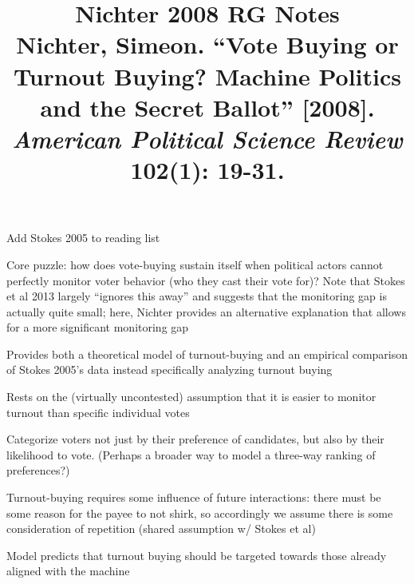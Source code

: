 \documentclass[12pt]{article}
\title{\textbf{Nichter 2008 RG Notes}\\
\large Nichter, Simeon. ``Vote Buying or Turnout Buying? Machine Politics and the Secret Ballot'' [2008].\\
\textit{American Political Science Review} 102(1): 19-31.}
\author{}
\date{}
\begin{document}
\maketitle

Add Stokes 2005 to reading list

Core puzzle: how does vote-buying sustain itself when political actors cannot perfectly monitor voter behavior (who they cast their vote for)? Note that Stokes et al 2013 largely ``ignores this away'' and suggests that the monitoring gap is actually quite small; here, Nichter provides an alternative explanation that allows for a more significant monitoring gap

Provides both a theoretical model of turnout-buying and an empirical comparison of Stokes 2005's data instead specifically analyzing turnout buying

Rests on the (virtually uncontested) assumption that it is easier to monitor turnout than specific individual votes

Categorize voters not just by their preference of candidates, but also by their likelihood to vote. (Perhaps a broader way to model a three-way ranking of preferences?)

Turnout-buying requires some influence of future interactions: there must be some reason for the payee to not shirk, so accordingly we assume there is some consideration of repetition (shared assumption w/ Stokes et al)

Model predicts that turnout buying should be targeted towards those already aligned with the machine
\end{document}
